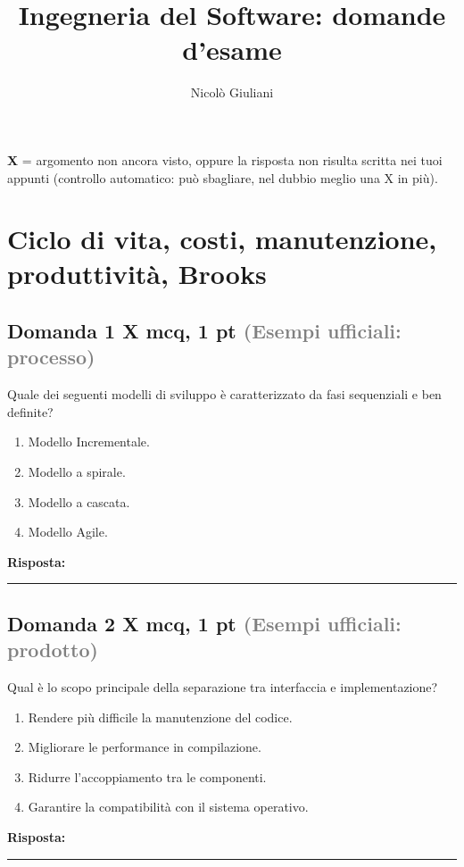 \documentclass[a4paper,11pt]{article}
\title{Ingegneria del Software: domande d'esame}
\author{Nicolò Giuliani}
\date{}
\begin{document}
\maketitle
\textbf{X} = argomento non ancora visto, oppure la risposta non risulta scritta nei tuoi appunti (controllo automatico: può sbagliare, nel dubbio meglio una X in più).
\bigskip
\tableofcontents
\newpage
\section{Ciclo di vita, costi, manutenzione, produttività, Brooks}

\subsection*{Domanda 1 X \hfill {\small mcq, 1 pt \textcolor{gray}{(Esempi ufficiali: processo)}}}
Quale dei seguenti modelli di sviluppo è caratterizzato da fasi sequenziali e ben definite?

\begin{enumerate}[label=\alph*)]
\item Modello Incrementale.
\item Modello a spirale.
\item Modello a cascata.
\item Modello Agile.
\end{enumerate}
\vspace{0.2cm}
\noindent\textbf{Risposta:}\par
\vspace{1.5cm}\hrule


\subsection*{Domanda 2 X \hfill {\small mcq, 1 pt \textcolor{gray}{(Esempi ufficiali: prodotto)}}}
Qual è lo scopo principale della separazione tra interfaccia e implementazione?

\begin{enumerate}[label=\alph*)]
\item Rendere più difficile la manutenzione del codice.
\item Migliorare le performance in compilazione.
\item Ridurre l'accoppiamento tra le componenti.
\item Garantire la compatibilità con il sistema operativo.
\end{enumerate}
\vspace{0.2cm}
\noindent\textbf{Risposta:}\par
\vspace{1.5cm}\hrule
\end{document}
